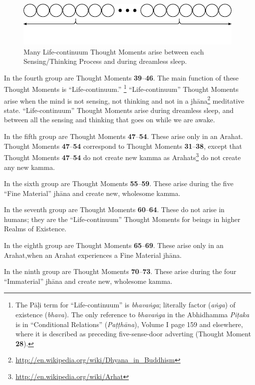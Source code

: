 \begin{figure}[h]
\centering
\includegraphics[width=1.0\linewidth]{./Diagrams/Life_Cont}
\caption{Many Life-continuum Thought Moments arise between each Sensing/Thinking Process and during dreamless sleep.}
\label{fig:Life_Cont}
\end{figure}

In the fourth group are Thought Moments \textbf{39}--\textbf{46}. The main function of these Thought Moments is “Life-continuum.” \footnote{The Pāḷi term for “Life-continuum” is \textit{bhavaṅga}; literally factor (\textit{aṅga}) of existence (\textit{bhava}). The only reference to \textit{bhavaṅga} in the Abhidhamma \textit{Piṭaka} is in “Conditional Relations” (\textit{Paṭṭhāna}), Volume I page 159 and elsewhere, where it is described as preceding five-sense-door adverting (Thought Moment \textbf{28}).} “Life-continuum” Thought Moments arise when the mind is not sensing, not thinking and not in a jhāna\footnote{\url{http://en.wikipedia.org/wiki/Dhyana_in_Buddhism}} meditative state. “Life-continuum” Thought Moments arise during dreamless sleep, and between all the sensing and thinking that goes on while we are awake.

In the fifth group are Thought Moments \textbf{47}--\textbf{54}. These arise only in an Arahat. Thought Moments \textbf{47}--\textbf{54} correspond to Thought Moments \textbf{31}--\textbf{38}, except that Thought Moments \textbf{47}--\textbf{54} do not create new kamma as Arahats\footnote{\url{http://en.wikipedia.org/wiki/Arhat}} do not create any new kamma.

In the sixth group are Thought Moments \textbf{55}--\textbf{59}. These arise during the five “Fine Material” jhāna and create new, wholesome kamma.

In the seventh group are Thought Moments \textbf{60}--\textbf{64}. These do not arise in humans; they are the “Life-continuum” Thought Moments for beings in higher Realms of Existence.

In the eighth group are Thought Moments \textbf{65}--\textbf{69}. These arise only in an Arahat,when an Arahat experiences a Fine Material jhāna.

In the ninth group are Thought Moments \textbf{70}--\textbf{73}. These arise during the four “Immaterial” jhāna and create new, wholesome kamma.

